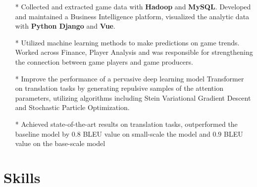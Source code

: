 \documentclass[10pt,letterpaper,sans]{moderncv} %
\begin{document}
\begin{itemize}
\item[*] Collected and extracted game data with \textbf{Hadoop} and \textbf{MySQL}. Developed and maintained a Business Intelligence platform, visualized the analytic data with \textbf{Python Django} and \textbf{Vue}.
\item[*] Utilized machine learning methods to make predictions on game trends. Worked across Finance, Player Analysis and was responsible for strengthening the connection between game players and game producers.
\end{itemize}

\begin{itemize}
\item[*] Improve the performance of a pervasive deep learning model Transformer on translation tasks by generating repulsive samples of the attention parameters, utilizing algorithms including Stein Variational Gradient Descent and Stochastic Particle Optimization.
\item[*] Achieved state-of-the-art results on translation tasks, outperformed the baseline model by $0.8$ BLEU value on small-scale the model and $0.9$ BLEU value on the base-scale model
\end{itemize}

\section{Skills}

\end{document}

